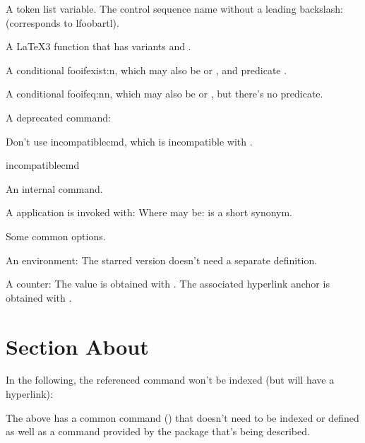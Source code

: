 \documentclass[titlepage=false,oneside,
 fontsize=12pt,captions=tableheading]{scrbook}
\begin{document}
A  token list variable.
The control sequence name without a leading backslash:
 (corresponds to
\gls{lfoobartl}).

A \LaTeX3 function that has variants  and
.

A conditional \gls{fooifexist:n}, which may also be
 or , and predicate
.

A conditional \gls{fooifeq:nn}, which may also be
 or , but there's no
predicate.

A deprecated command:


Don't use \gls{incompatiblecmd}, which is incompatible with
.
\begin{badcodebox}
\gls{incompatiblecmd}
\end{badcodebox}

An internal command.

A  application  is invoked with:
Where  may be:
 is a short synonym.

Some common options.


An environment:
The starred version  doesn't need a separate
definition.

A counter:
The value is obtained with . The associated
hyperlink anchor is obtained with .

\section{Section About }

In the following, the referenced command won't be indexed (but will
have a hyperlink):
\begin{codebox}
\end{codebox}
The above has a common command () that doesn't
need to be indexed or defined as well as a command provided by the
package that's being described.
\end{document}
